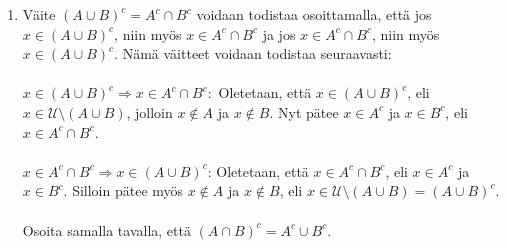 \documentclass[a4paper,12pt]{article}
\begin{document}
\begin{enumerate}
\begin{enumerate}
Oletetaan, että $a\in \left(A\cap B \right)\setminus B$. Tästä voidaan erotuksen määritelmän nojalla päätellä, että $a\in A\cap B$ ja $a\notin B$. Edelleen koska $a \in A \cap B$, voidaan leikkauksen määritelmän nojalla päätellä, että 
\[
a\in A \quad \text{ja}\quad a \in B.
\]

Olemme päätyneet ristiriitaiseen tilanteeseen, jossa $a\notin B$ ja $a\in B$. Ainoa tapa ratkaista tilanne on päätellä, että alkio a ei voi olla olemassa, eli $A\cap B \setminus B$ on tyhjä joukko. Voimme siis päätellä, että 
\[
\left(A\cap B\right)\setminus B=\emptyset.
\]
Koska $\emptyset\subset A$, väite on tosi.\vspace{0.5cm}


\item Merkit\"a\"an $2\mathbb{N}=\{2n \, | \, n \in \mathbb{N}\}$ ja $4\mathbb{N}=\{4n \, | \, n \in \mathbb{N}\}$.
Todista, ett\"a $4\mathbb{N} \subset 2\mathbb{N}$.\vspace{1em}

\textbf{Vastaus:}

Oletetaan, että $2\mathbb{N} = \left\{2n\mid n\in\mathbb{N}\right\}$ ja $4\mathbb{N} = \left\{4n \mid n \in \mathbb{N}\right\}$. Osoitetaan, että $4\mathbb{N}\subset 2\mathbb{N}$.

Oletetaan, että $x\in 4\mathbb{N}$. Joukon $4\mathbb{N}$ määritelmän pohjalta tiedetään, että on olemassa $n\in \mathbb{N}$, joka voidaan merkitä lausekkeeseen $x=4n$. Lauseketta voidaan muokata muotoon $x=2\cdot\left(2n\right)$. Merkitään $k=2n$. Koska n on luonnollinen luku, myös $2n$ on luonnollinen luku, siis $k\in\mathbb{N}$. Nyt meillä on $x=2k\mid k\in\mathbb{N}$. Tämä vastaa muuttujan $2\mathbb{N}$ määritelmää, joten $x\in 2\mathbb{N}$. Koska mielivaltainen alkio x kuuluu joukkoon $2\mathbb{N}$, voidaan päätellä, että $4\mathbb{N}\subset 2\mathbb{N}$.\vspace{1em}

\end{enumerate}

\item Väite $(A \cup B)^c = A^c \cap B^c$ voidaan todistaa osoittamalla, että jos $x \in (A \cup B)^c$, niin myös $x \in A^c \cap B^c$ ja jos $x \in A^c \cap B^c$, niin myös $x \in (A \cup B)^c$. Nämä väitteet voidaan todistaa seuraavasti: \\
\\
$x \in (A\cup B)^c \Rightarrow x \in A^c \cap B^c:$ Oletetaan, että $x \in (A\cup B)^c$, eli $x \in \mathcal{U} \setminus (A \cup B)$, jolloin $x \not \in A$ ja $x \not \in B$. Nyt pätee $x \in A^c$ ja $x \in B^c$, eli $x \in A^c \cap B^c$. \\
\\
$x \in A^c \cap B^c \Rightarrow x \in (A \cup B)^c$: Oletetaan, että $x \in A^c \cap B^c$, eli $x \in A^c$ ja $x \in B^c$. Silloin pätee myös $x \not \in A$ ja $x \not \in B$, eli $x \in \mathcal{U} \setminus (A \cup B) = (A \cup B)^c$. \\
\\
Osoita samalla tavalla, että $(A \cap B)^c =A^c \cup B^c$.\vspace{1em}


\end{enumerate}
\end{document}

